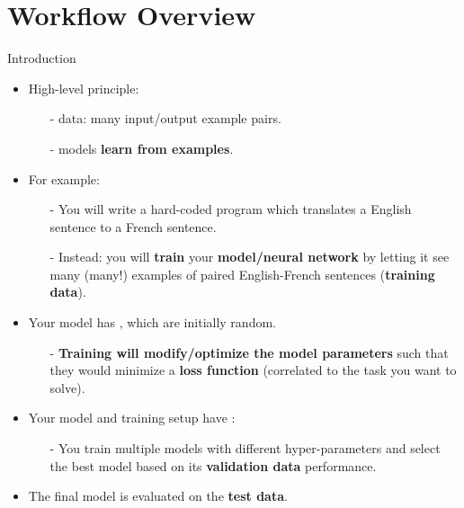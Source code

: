 \section{Workflow Overview}

\begin{frame}{Introduction}
\begin{itemize}
\item High-level principle:
\begin{itemize}
\item[-] data: many input/output example pairs.
\item[-] models \textbf{learn from examples}.
\end{itemize}
 \pause
\item For example:
\begin{itemize}
\item[-] You will  write a hard-coded program which translates a English sentence to a French sentence.
 \pause
\item[-] Instead: you will \textbf{train} your \textbf{model/neural network} by letting it see many (many!) examples of paired English-French sentences (\textbf{training data}).
\end{itemize}
 \pause
\item Your model has , which are initially random.\\
\begin{itemize}
\item[-] \textbf{Training will modify/optimize the model parameters} such that they would minimize a \textbf{loss function} (correlated to the task you want to solve).
\end{itemize}
\pause
\item Your model and training setup have :
\begin{itemize}
\item[-] You train multiple models with different hyper-parameters and select the best model based on its \textbf{validation data} performance.
\end{itemize}
 \pause
\item The final model is evaluated on the \textbf{test data}.
\end{itemize}
\end{frame}

